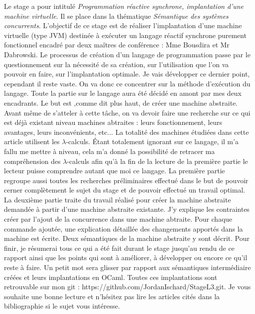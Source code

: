 \documentclass[10pt,a4paper]{report}
\begin{document}
Le stage a pour intitulé \textit{Programmation réactive synchrone, implantation d’une machine virtuelle}. Il se place dans la thématique
\textit{Sémantique des systèmes concurrents}. L’objectif de ce stage est de réaliser l’implantation d’une machine virtuelle (type JVM) destinée
à exécuter un langage réactif synchrone purement fonctionnel encadré par deux maîtres de conférence : Mme Bousdira et Mr Dabrowski.
\smallbreak
Le processus de création d'un langage de programmation passe par le questionnement sur la nécessité de sa création, sur l'utilisation que
l'on va pouvoir en faire, sur l'implantation optimale. Je vais développer ce dernier point, cependant il reste vaste. On va donc ce concentrer
sur la méthode d'exécution du langage. Toute la partie sur le langage aura été décidé en amont par mes deux encadrants.
\smallbreak
Le but est ,comme dit plus haut, de créer une machine abstraite. Avant même de s'atteler à cette tâche, on va devoir faire une recherche sur ce
qui est déjà existant niveau machines abtraites : leurs fonctionnement, leurs avantages, leurs inconvénients, etc... La totalité des machines étudiées
dans cette article utilisent les $\lambda$-calculs. Étant totalement ignorant sur ce langage, il m'a fallu me mettre à niveau, cela m'a donné la
possibilité de retracer ma compréhension des $\lambda$-calculs afin qu'à la fin de la lecture de la première partie le lecteur puisse comprendre autant
que moi ce langage. La première partie regroupe aussi toutes les recherches préliminaires effectué dans le but de pouvoir cerner complètement le sujet
du stage et de pouvoir effectué un travail optimal.
\smallbreak
La deuxième partie traite du travail réalisé pour créer la machine abstraite demandée à partir d'une machine abstraite existante. J'y explique les contraintes créer par l'ajout de la concurrence dans une machine abtraite. Pour chaque commande ajoutée, une explication détaillée des changements apportés dans la machine est écrite. Deux sémantiques de la machine abstraite y sont décrit.
\smallbreak
Pour finir, je résumerai tous ce qui a été fait durant le stage jusqu'au rendu de ce rapport ainsi que les points qui sont à améliorer, à développer ou encore ce qu'il reste à faire. Un petit mot sera glisser par rapport aux sémantiques intermédiaire créées et leurs implantations en OCaml. Toutes ces implantations sont retrouvable sur mon git : https://github.com/JordanIschard/StageL3.git.
\smallbreak
Je vous souhaite une bonne lecture et n'hésitez pas lire les articles cités dans la bibliographie si le sujet vous intéresse.
\newpage
\end{document}
